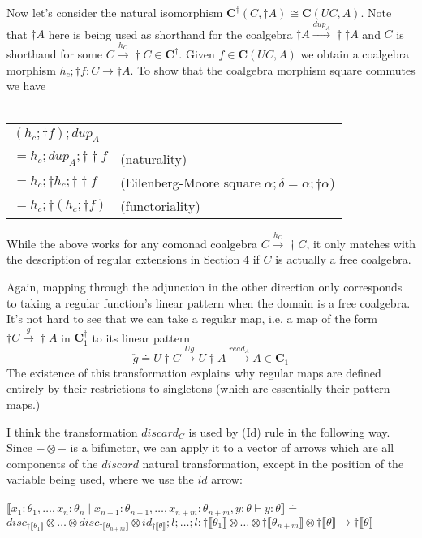 \documentclass{article}
\newcommand{\mbf}{\mathbf}
\newcommand{\sem}[1]{\llbracket #1 \rrbracket}
\begin{document}
Now let's consider the natural isomorphism $\mbf{C}^\dagger(C,\dagger A) \cong \mbf{C}(UC,A)$. Note that
$\dagger A$ here is being used as shorthand for the coalgebra 
$\dagger A \overset{\mathit{dup}_A}{\longrightarrow} \dagger \dagger A$ and $C$ is shorthand for some $C \overset{h_C}{\longrightarrow} \dagger C \in \mathbf{C}^\dagger$. Given $f \in \mbf{C}(UC,A)$ we obtain a coalgebra morphism
$h_c;\dagger f : C \to \dagger A$. To show that the coalgebra morphism square commutes we have\\~\\
\begin{tabular}{ll}
$(h_c;\dagger f);\mathit{dup}_A$ & ~ \\
$= h_c;\mathit{dup}_A;\dagger \dagger f$ & (naturality)  \\
$= h_c;\dagger h_c;\dagger \dagger f$ & (Eilenberg-Moore square $\alpha;\delta = \alpha;\dagger\alpha$) \\
$= h_c;\dagger(h_c;\dagger f)$ & (functoriality)
\end{tabular}

While the above works for any comonad coalgebra $C \overset{h_C}{\longrightarrow} \dagger C$, it only matches with the description of regular extensions in Section 4 if $C$ is actually a free coalgebra.

Again, mapping through the adjunction in the other direction only corresponds to taking a regular function's linear pattern when the domain is a free coalgebra. It's not hard to see that 
we can take a regular map, i.e. a map of the form 
$\dagger C \overset{g}{\to} \dagger A$ in $\mathbf{C}^{\dagger}_1$ to 
its linear pattern $$\check{g} \doteq U \! \dagger \! C \overset{Ug}{\longrightarrow} U \! \dagger \! A \overset{\mathit{read}_A}{\longrightarrow} A \in \mbf{C}_1$$ The existence of this 
transformation explains why regular maps are defined entirely by their restrictions to singletons 
(which are essentially their pattern maps.) 

I think the transformation $\mathit{discard}_C$ is used by (Id) rule in the following way. Since $- \otimes -$ is
a bifunctor, we can apply it to a vector of arrows which are all components of the $\mathit{discard}$ natural transformation, except in the position of the variable being used, where we use the $\mathit{id}$ arrow:\\~\\
$\sem{x_1:\theta_1,\ldots,x_n:\theta_n \mid x_{n+1} : \theta_{n+1},\ldots,x_{n+m} : \theta_{n+m},y : \theta \vdash y : \theta} \doteq$\\
$\mathit{disc}_{\dagger \sem{\theta_1}} \otimes \ldots \otimes \mathit{disc}_{\dagger \sem{\theta_{n + m}}} \otimes \mathit{id}_{\dagger \sem{\theta}};l;\ldots;l
: \dagger \sem{\theta_1} \otimes \ldots \otimes \dagger \sem{\theta_{n+m}} \otimes \dagger \sem{\theta} \to \dagger \sem{\theta}$
\end{document}
